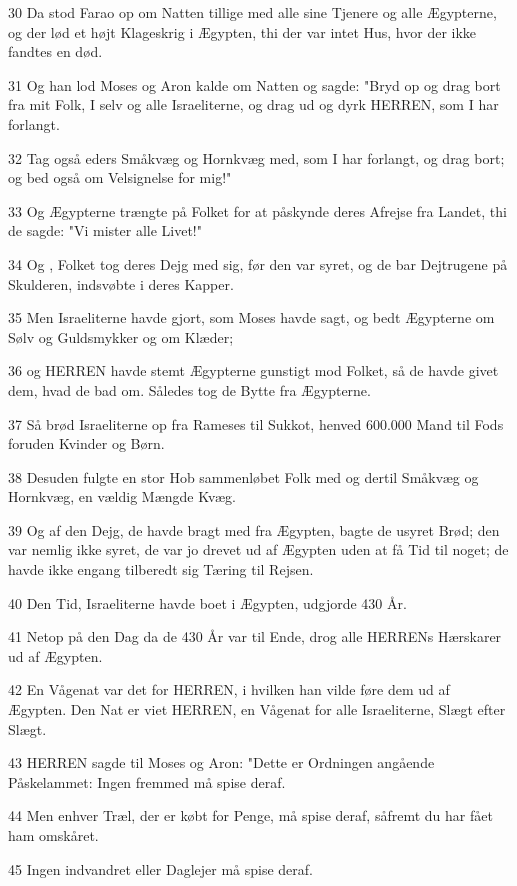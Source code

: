 \par 30 Da stod Farao op om Natten tillige med alle sine Tjenere og alle Ægypterne, og der lød et højt Klageskrig i Ægypten, thi der var intet Hus, hvor der ikke fandtes en død.
\par 31 Og han lod Moses og Aron kalde om Natten og sagde: "Bryd op og drag bort fra mit Folk, I selv og alle Israeliterne, og drag ud og dyrk HERREN, som I har forlangt.
\par 32 Tag også eders Småkvæg og Hornkvæg med, som I har forlangt, og drag bort; og bed også om Velsignelse for mig!"
\par 33 Og Ægypterne trængte på Folket for at påskynde deres Afrejse fra Landet, thi de sagde: "Vi mister alle Livet!"
\par 34 Og , Folket tog deres Dejg med sig, før den var syret, og de bar Dejtrugene på Skulderen, indsvøbte i deres Kapper.
\par 35 Men Israeliterne havde gjort, som Moses havde sagt, og bedt Ægypterne om Sølv og Guldsmykker og om Klæder;
\par 36 og HERREN havde stemt Ægypterne gunstigt mod Folket, så de havde givet dem, hvad de bad om. Således tog de Bytte fra Ægypterne.
\par 37 Så brød Israeliterne op fra Rameses til Sukkot, henved 600.000 Mand til Fods foruden Kvinder og Børn.
\par 38 Desuden fulgte en stor Hob sammenløbet Folk med og dertil Småkvæg og Hornkvæg, en vældig Mængde Kvæg.
\par 39 Og af den Dejg, de havde bragt med fra Ægypten, bagte de usyret Brød; den var nemlig ikke syret, de var jo drevet ud af Ægypten uden at få Tid til noget; de havde ikke engang tilberedt sig Tæring til Rejsen.
\par 40 Den Tid, Israeliterne havde boet i Ægypten, udgjorde 430 År.
\par 41 Netop på den Dag da de 430 År var til Ende, drog alle HERRENs Hærskarer ud af Ægypten.
\par 42 En Vågenat var det for HERREN, i hvilken han vilde føre dem ud af Ægypten. Den Nat er viet HERREN, en Vågenat for alle Israeliterne, Slægt efter Slægt.
\par 43 HERREN sagde til Moses og Aron: "Dette er Ordningen angående Påskelammet: Ingen fremmed må spise deraf.
\par 44 Men enhver Træl, der er købt for Penge, må spise deraf, såfremt du har fået ham omskåret.
\par 45 Ingen indvandret eller Daglejer må spise deraf.
